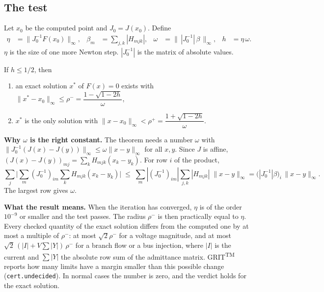 \documentclass[a4paper,11pt]{article}
\newcommand{\TM}{\textsuperscript{TM}}
\newcommand{\GRIT}{GRIT\TM}
\begin{document}
\subsection{The test}

Let $x_0$ be the computed point and $J_0=J(x_0)$. Define
\begin{align*}
\eta &= \|J_0^{-1}F(x_0)\|_\infty, &
\beta_m &= \sum_{j,k} |H_{mjk}|, &
\omega &= \big\|\, |J_0^{-1}|\,\beta \,\big\|_\infty, &
h &= \eta\,\omega .
\end{align*}
$\eta$ is the size of one more Newton step. $|J_0^{-1}|$ is the matrix of absolute values.

\begin{tcolorbox}[colback=white,colframe=grim-blue,title={Newton-Kantorovich theorem (form used by \GRIT)}]
If $h \le 1/2$, then
\begin{enumerate}[nosep]
  \item an exact solution $x^*$ of $F(x)=0$ exists with $\|x^*-x_0\|_\infty \le \rho^- = \dfrac{1-\sqrt{1-2h}}{\omega}$,
  \item $x^*$ is the only solution with $\|x-x_0\|_\infty < \rho^+ = \dfrac{1+\sqrt{1-2h}}{\omega}$.
\end{enumerate}
\end{tcolorbox}

\textbf{Why $\omega$ is the right constant.} The theorem needs a number $\omega$ with $\|J_0^{-1}(J(x)-J(y))\|_\infty \le \omega\|x-y\|_\infty$ for all $x,y$. Since $J$ is affine, $(J(x)-J(y))_{mj}=\sum_k H_{mjk}(x_k-y_k)$. For row $i$ of the product,
\[
\sum_j \Big| \sum_m (J_0^{-1})_{im} \sum_k H_{mjk}(x_k-y_k) \Big|
\;\le\; \sum_m |(J_0^{-1})_{im}| \sum_{j,k}|H_{mjk}| \;\|x-y\|_\infty
= \big(|J_0^{-1}|\beta\big)_i \,\|x-y\|_\infty .
\]
The largest row gives $\omega$.

\textbf{What the result means.} When the iteration has converged, $\eta$ is of the order $10^{-9}$ or smaller and the test passes. The radius $\rho^-$ is then practically equal to $\eta$. Every checked quantity of the exact solution differs from the computed one by at most a multiple of $\rho^-$: at most $\sqrt2\rho^-$ for a voltage magnitude, and at most $\sqrt2\,(|I|+V\sum|Y|)\,\rho^-$ for a branch flow or a bus injection, where $|I|$ is the current and $\sum|Y|$ the absolute row sum of the admittance matrix. \GRIT{} reports how many limits have a margin smaller than this possible change (\texttt{cert.undecided}). In normal cases the number is zero, and the verdict holds for the exact solution.
\end{document}
